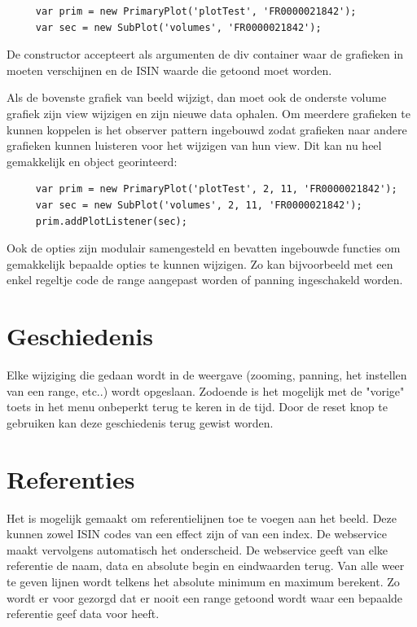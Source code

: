 \begin{verbatim}
     var prim = new PrimaryPlot('plotTest', 'FR0000021842');
     var sec = new SubPlot('volumes', 'FR0000021842');
\end{verbatim}

De constructor accepteert als argumenten de div container waar de grafieken in moeten verschijnen en de ISIN waarde die getoond moet worden.

Als de bovenste grafiek van beeld wijzigt, dan moet ook de onderste volume grafiek zijn view wijzigen en zijn nieuwe data ophalen. Om meerdere grafieken te kunnen koppelen is het observer pattern ingebouwd zodat grafieken naar andere grafieken kunnen luisteren voor het wijzigen van hun view. Dit kan nu heel gemakkelijk en object georinteerd:

\begin{verbatim}
     var prim = new PrimaryPlot('plotTest', 2, 11, 'FR0000021842');
     var sec = new SubPlot('volumes', 2, 11, 'FR0000021842');
     prim.addPlotListener(sec);
\end{verbatim}

Ook de opties zijn modulair samengesteld en bevatten ingebouwde functies om gemakkelijk bepaalde opties te kunnen wijzigen. Zo kan bijvoorbeeld met een enkel regeltje code de range aangepast worden of panning ingeschakeld worden.

\section{Geschiedenis}

Elke wijziging die gedaan wordt in de weergave (zooming, panning, het instellen van een range, etc..) wordt opgeslaan. Zodoende is het mogelijk met de "vorige" toets in het menu onbeperkt terug te keren in de tijd. Door de reset knop te gebruiken kan deze geschiedenis terug gewist worden.

\section{Referenties}

Het is mogelijk gemaakt om referentielijnen toe te voegen aan het beeld. Deze kunnen zowel ISIN codes van een effect zijn of van een index. De webservice maakt vervolgens automatisch het onderscheid. De webservice geeft van elke referentie de naam, data en absolute begin en eindwaarden terug. Van alle weer te geven lijnen wordt telkens het absolute minimum en maximum berekent. Zo wordt er voor gezorgd dat er nooit een range getoond wordt waar een bepaalde referentie geef data voor heeft.

